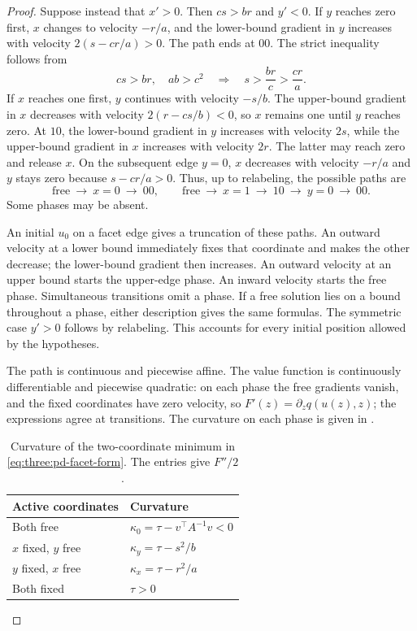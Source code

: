 \begin{proof}
Suppose instead that $x'>0$. Then $cs>br$ and $y'<0$. If $y$ reaches zero
first, $x$ changes to velocity $-r/a$, and the lower-bound gradient in $y$
increases with velocity $2(s-cr/a)>0$. The path ends at $00$. The strict
inequality follows from
\[
 cs>br,\quad ab>c^2
 \quad\Longrightarrow\quad s>\frac{br}{c}>\frac{cr}{a}.
\]
If $x$ reaches one first, $y$ continues with velocity $-s/b$. The
upper-bound gradient in $x$ decreases with velocity $2(r-cs/b)<0$, so
$x$ remains one until $y$ reaches zero. At $10$, the lower-bound gradient
in $y$ increases with velocity $2s$, while the upper-bound gradient in $x$
increases with velocity $2r$. The latter may reach zero and release $x$.
On the subsequent edge $y=0$, $x$ decreases with velocity $-r/a$ and $y$
stays zero because $s-cr/a>0$. Thus, up to relabeling, the possible paths
are
\begin{equation}\label{eq:three:pd-paths}
 \text{free}\ \longrightarrow\ x=0\ \longrightarrow\ 00,
 \qquad
 \text{free}\ \longrightarrow\ x=1\ \longrightarrow\ 10
       \ \longrightarrow\ y=0\ \longrightarrow\ 00.
\end{equation}
Some phases may be absent.

An initial $u_0$ on a facet edge gives a truncation of these paths. An
outward velocity at a lower bound immediately fixes that coordinate and
makes the other decrease; the lower-bound gradient then increases. An
outward velocity at an upper bound starts the upper-edge phase. An inward
velocity starts the free phase. Simultaneous transitions omit a phase.
If a free solution lies on a bound throughout a phase, either description
gives the same formulas. The symmetric case $y'>0$ follows by relabeling.
This accounts for every initial position allowed by the hypotheses.

The path is continuous and piecewise affine. The value function is
continuously differentiable and piecewise quadratic: on each phase the
free gradients vanish, and the fixed coordinates have zero velocity, so
$F'(z)=\partial_zq(u(z),z)$; the expressions agree at transitions.
The curvature on each phase is given in .

\begin{table}[htbp]
\centering
\caption{Curvature of the two-coordinate minimum in
\eqref{eq:three:pd-facet-form}. The entries give $F''/2$.}
\label{tab:three:facet-curvature}
\begin{tabular}{ll}
\toprule
Active coordinates & Curvature\\
\midrule
Both free & $\kappa_0=\tau-v^\top A^{-1}v<0$\\
$x$ fixed, $y$ free & $\kappa_y=\tau-s^2/b$\\
$y$ fixed, $x$ free & $\kappa_x=\tau-r^2/a$\\
Both fixed & $\tau>0$\\
\bottomrule
\end{tabular}
\end{table}


\end{proof}
